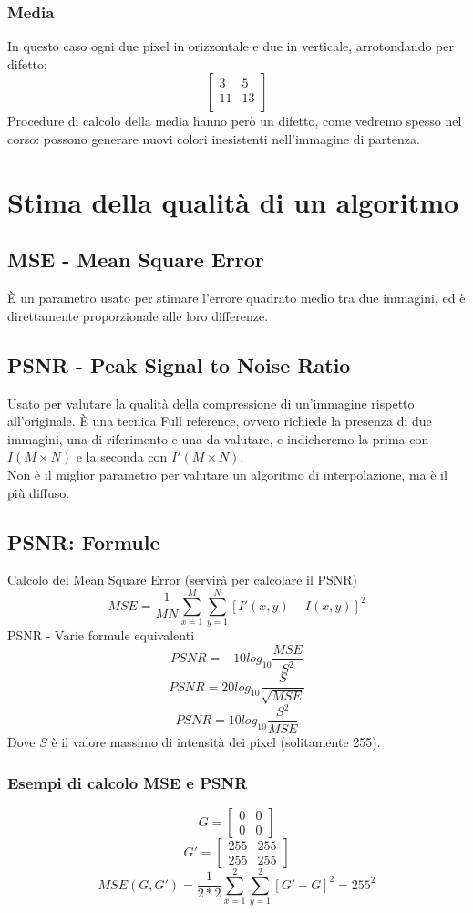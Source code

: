 \documentclass{report}
\begin{document}
\subsection{Media}
In questo caso ogni due pixel in orizzontale e due in verticale, arrotondando per difetto:
$$
\begin{bmatrix}
	3  & 5  \\
	11 & 13 \\
\end{bmatrix}
$$
Procedure di calcolo della media hanno però un difetto, come vedremo spesso nel corso: possono generare nuovi colori inesistenti nell'immagine di partenza.
\newpage
\chapter{Stima della qualità di un algoritmo}
\section{MSE - Mean Square Error}
È un parametro usato per stimare l'errore quadrato medio tra due immagini, ed è direttamente proporzionale alle loro differenze.

\section{PSNR - Peak Signal to Noise Ratio}
Usato per valutare la qualità della compressione di un'immagine rispetto \\all'originale.
È una tecnica Full reference, ovvero richiede la presenza di due immagini, una di riferimento e una da valutare, e indicheremo la prima con $I(M \times N)$ e la seconda con $I'(M \times N)$.\\
Non è il miglior parametro per valutare un algoritmo di interpolazione, ma è il più diffuso.

\section{PSNR: Formule}
Calcolo del Mean Square Error (servirà per calcolare il PSNR)
$$ 
MSE = \frac{1}{MN}\sum^M_{x=1}\sum^N_{y=1} [ I'(x,y) - I(x,y)]^2
$$
PSNR - Varie formule equivalenti
$$
PSNR = -10log_{10}\frac{MSE}{S^2}
$$
$$
PSNR = 20log_{10}\frac{S}{\sqrt{MSE}}
$$
$$
PSNR = 10log_{10}\frac{S^2}{MSE}
$$
Dove $S$ è il valore massimo di intensità dei pixel (solitamente 255).
\subsection{Esempi di calcolo MSE e PSNR}
$$
G =
\begin{bmatrix}
	0 & 0 \\
	0 & 0 
\end{bmatrix}
$$
$$
G' =
\begin{bmatrix}
	255 & 255 \\
	255 & 255 
\end{bmatrix}
$$
$$
MSE(G, G') = \frac{1}{2*2}\sum^2_{x=1}\sum^2_{y=1}[G' - G]^2 = 255^2
$$
\end{document}
